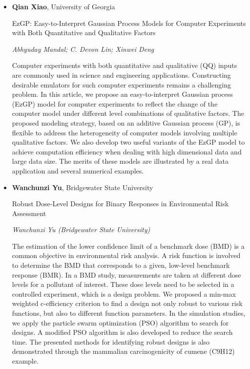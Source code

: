 \begin{itemize}
\item \textbf{Qian Xiao}, University of Georgia

EzGP: Easy-to-Interpret Gaussian Process Models for Computer Experiments with Both Quantitative and Qualitative Factors

\emph{\footnotesize Abhyuday Mandal; C. Devon Lin; Xinwei Deng}

Computer experiments with both quantitative and qualitative (QQ) inputs are commonly used in science and engineering applications. Constructing desirable emulators for such computer experiments remains a challenging problem. In this article, we propose an easy-to-interpret Gaussian process (EzGP) model for computer experiments to reflect the change of the computer model under different level combinations of qualitative factors. The proposed modeling strategy, based on an additive Gaussian process (GP), is flexible to address the heterogeneity of computer models involving multiple qualitative factors. We also develop two useful variants of the EzGP model to achieve computation efficiency when dealing with high dimensional data and large data size. The merits of these models are illustrated by a real data application and several numerical examples.


\item \textbf{Wanchunzi Yu}, Bridgewater State University

Robust Dose-Level Designs for Binary Responses in Environmental Risk Assessment

\emph{\footnotesize Wanchunzi Yu (Bridgewater State University)}

The estimation of the lower confidence limit of a benchmark dose (BMD) is a common objective in environmental risk analysis. A risk function is involved to determine the BMD that corresponds to a given, low-level benchmark response (BMR). In a BMD study, measurements are taken at different dose levels for a pollutant of interest. These dose levels need to be selected in a controlled experiment, which is a design problem. We proposed a min-max weighted c-efficiency criterion to find a design not only robust to various risk functions, but also to different function parameters. In the simulation studies, we apply the particle swarm optimization (PSO) algorithm to search for designs. A modified PSO algorithm is also developed to reduce the search time. The presented methods for identifying robust designs is also demonstrated through the mammalian carcinogenicity of cumene (C9H12) example.


\end{itemize}
